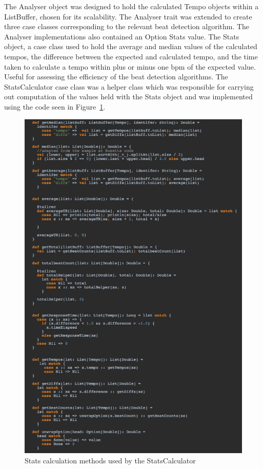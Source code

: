 \documentclass[a4paper, 11pt]{article}
\begin{document}
The Analyser object was designed to hold the calculated Tempo objects within a ListBuffer, chosen for its scalability. The Analyser trait was extended to create three case classes corresponding to the relevant beat detection algorithm. The Analyser implementations also contained an Option Stats value. The Stats object, a case class used to hold the average and median values of the calculated tempos, the difference between the expected and calculated tempo, and the time taken to calculate a tempo within plus or minus one bpm of the expected value. Useful for assessing the efficiency of the beat detection algorithms. The StatsCalculator case class was a helper class which was responsible for carrying out computation of the values held with the Stats object and was implemented using the code seen in Figure~\ref{fig: statsC}.

\begin{figure}[htbp]
\centering
\includegraphics[scale=0.35]{images/statscalc.jpg}
\caption{Stats calculation methods used by the StatsCalculator}
\label{fig: statsC}
\end{figure}
\end{document}
